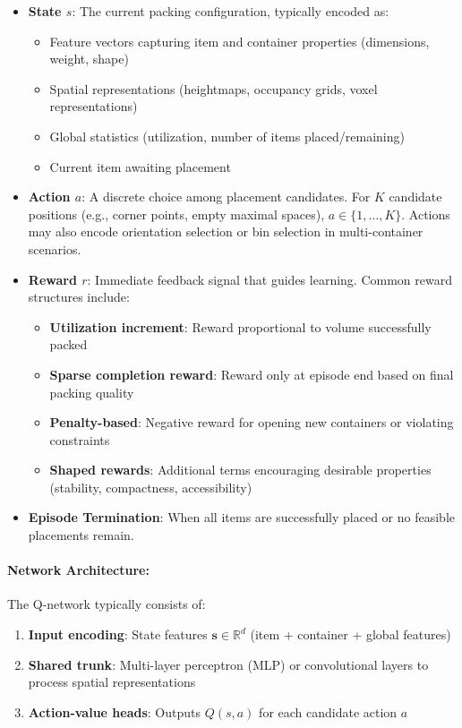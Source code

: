 \begin{itemize}
\item \textbf{State $s$}: The current packing configuration, typically encoded as:
  \begin{itemize}
  \item Feature vectors capturing item and container properties (dimensions, weight, shape)
  \item Spatial representations (heightmaps, occupancy grids, voxel representations)
  \item Global statistics (utilization, number of items placed/remaining)
  \item Current item awaiting placement
  \end{itemize}

\item \textbf{Action $a$}: A discrete choice among placement candidates. For $K$ candidate positions (e.g., corner points, empty maximal spaces), $a \in \{1, \ldots, K\}$. Actions may also encode orientation selection or bin selection in multi-container scenarios.

\item \textbf{Reward $r$}: Immediate feedback signal that guides learning. Common reward structures include:
  \begin{itemize}
  \item \textbf{Utilization increment}: Reward proportional to volume successfully packed
  \item \textbf{Sparse completion reward}: Reward only at episode end based on final packing quality
  \item \textbf{Penalty-based}: Negative reward for opening new containers or violating constraints
  \item \textbf{Shaped rewards}: Additional terms encouraging desirable properties (stability, compactness, accessibility)
  \end{itemize}

\item \textbf{Episode Termination}: When all items are successfully placed or no feasible placements remain.
\end{itemize}

\paragraph{Network Architecture:}

The Q-network typically consists of:

\begin{enumerate}
\item \textbf{Input encoding}: State features $\mathbf{s} \in \mathbb{R}^d$ (item + container + global features)
\item \textbf{Shared trunk}: Multi-layer perceptron (MLP) or convolutional layers to process spatial representations
\item \textbf{Action-value heads}: Outputs $Q(s, a)$ for each candidate action $a$
\end{enumerate}

